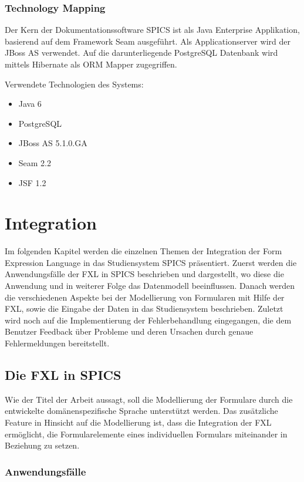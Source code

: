 \subsection{Technology Mapping}

Der Kern der Dokumentationssoftware SPICS ist als Java Enterprise Applikation, basierend auf dem Framework Seam ausgeführt. Als Applicationserver wird der JBoss AS verwendet. Auf die darunterliegende PostgreSQL Datenbank wird mittels Hibernate als ORM Mapper zugegriffen.

Verwendete Technologien des Systems:

\begin{itemize}
	\item Java 6
	\item PostgreSQL
	\item JBoss AS 5.1.0.GA
	\item Seam 2.2
	\item JSF 1.2
\end{itemize}



\chapter{Integration}


Im folgenden Kapitel werden die einzelnen Themen der Integration der Form Expression Language in das Studiensystem SPICS präsentiert. Zuerst werden die Anwendungsfälle der FXL in SPICS beschrieben und dargestellt, wo diese die Anwendung und in weiterer Folge das Datenmodell beeinflussen. Danach werden die verschiedenen Aspekte bei der Modellierung von Formularen mit Hilfe der FXL, sowie die Eingabe der Daten in das Studiensystem beschrieben. Zuletzt wird noch auf die Implementierung der Fehlerbehandlung eingegangen, die dem Benutzer Feedback über Probleme und deren Ursachen durch genaue Fehlermeldungen bereitstellt.


\section{Die FXL in SPICS}

Wie der Titel der Arbeit aussagt, soll die Modellierung der Formulare durch die entwickelte domänenspezifische Sprache unterstützt werden. Das zu\-sätz\-li\-che Feature in Hinsicht auf die Modellierung ist, dass die Integration der FXL ermöglicht, die Formularelemente eines individuellen Formulars miteinander in Beziehung zu setzen.

\subsection{Anwendungsfälle}


